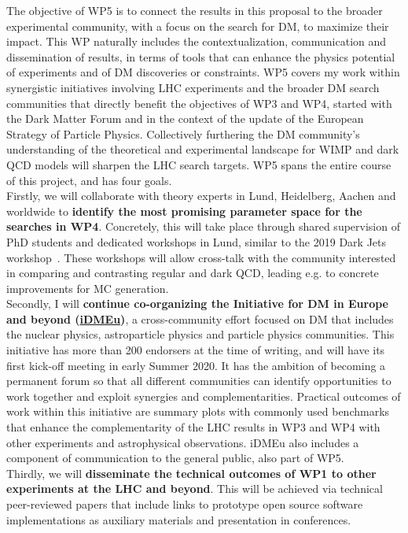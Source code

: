 The objective of WP5 is to connect the results in this proposal to the broader experimental community, with a focus on the search for DM, to maximize their impact. 
This WP naturally includes the contextualization, communication and dissemination of results, in terms of tools that can enhance the physics potential of experiments and of DM discoveries or constraints. WP5 covers my work within synergistic initiatives involving LHC experiments and the broader DM search communities that directly benefit the objectives of WP3 and WP4, started with the Dark Matter Forum and in the context of the update of the European Strategy of Particle Physics. Collectively furthering the DM community’s understanding of the theoretical and experimental landscape for WIMP and dark QCD models will sharpen the LHC search targets. WP5 spans the entire course of this project, and has four goals. 
\\
\indent
Firstly, we will collaborate with theory experts in Lund, Heidelberg, Aachen and worldwide to \textbf{identify the most promising parameter space for the searches in WP4}.
Concretely, this will take place through shared supervision of PhD students and dedicated workshops in Lund, similar to the 2019 Dark Jets workshop~\cite{ToBeCited}. %
These workshops will allow cross-talk with the community interested in comparing and contrasting regular and dark QCD, leading e.g. to concrete improvements for MC generation. 
\\
\indent
Secondly, I will \textbf{continue co-organizing the Initiative for DM in Europe and beyond (\href{https://indico.cern.ch/e/iDMEu/}{iDMEu})}, a cross-community effort focused on DM that includes the nuclear physics, astroparticle physics and particle physics communities. 
This initiative has more than 200 endorsers at the time of writing, and will have its first kick-off meeting in early Summer 2020. 
It has the ambition of becoming a permanent forum so that all different communities can identify opportunities to work together and exploit synergies and complementarities. 
Practical outcomes of work within this initiative are summary plots with commonly used benchmarks that enhance the complementarity of the LHC results in WP3 and WP4 with other experiments and astrophysical observations. iDMEu also includes a component of communication to the general public, also part of WP5. 
\\
\indent
Thirdly, we will \textbf{disseminate the technical outcomes of WP1 to other experiments at the LHC and beyond}. 
This will be achieved via technical peer-reviewed papers that include links to prototype open source software implementations as auxiliary materials and presentation in conferences. 
